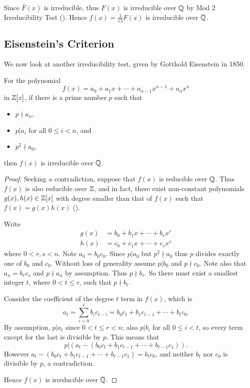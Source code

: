 \begin{example}
    Since $\bar{F}(x)$ is irreducible, thus $F(x)$ is irreducible over $\mathbb{Q}$ by Mod 2 Irreducibility Test (). Hence $f(x) = \frac1{15} F(x)$ is irreducible over $\mathbb{Q}$.
\end{example}

\subsection{Eisenstein's Criterion}
We now look at another irreducibility test, given by Gotthold Eisenstein in 1850.

\begin{theorem}\label{thrm-eisenstein-criterion}
    For the polynomial
    \[
        f(x) = a_0 + a_1x + \cdots + a_{n-1}x^{n-1} + a_nx^n
    \]
    in $\mathbb{Z}[x]$, if there is a prime number $p$ such that
    \begin{itemize}
        \item $p \nmid a_n$,
        \item $p \vert a_i$ for all $0 \leq i < n$, and
        \item $p^2 \nmid a_0$,
    \end{itemize}
    then $f(x)$ is irreducible over $\mathbb{Q}$.
\end{theorem}
\begin{proof}
    Seeking a contradiction, suppose that $f(x)$ is reducible over $\mathbb{Q}$. Thus $f(x)$ is also reducible over $\mathbb{Z}$, and in fact, there exist non-constant polynomials $g(x),h(x) \in \mathbb{Z}[x]$ with degree smaller than that of $f(x)$ such that $f(x) = g(x)h(x)$ ().

    Write
    \begin{align*}
        g(x) &= b_0 + b_1x + \cdots + b_rx^r\\
        h(x) &= c_0 + c_1x + \cdots + c_sx^s
    \end{align*}
    where $0 < r, s < n$. Note $a_0 = b_0c_0$. Since $p \vert a_0$ but $p^2 \nmid a_0$ thus $p$ divides exactly one of $b_0$ and $c_0$. Without loss of generality assume $p \vert b_0$ and $p \nmid c_0$. Note also that $a_n = b_rc_s$ and $p \nmid a_n$ by assumption. Thus $p \nmid b_r$. So there must exist a smallest integer $t$, where $0 < t \leq r$, such that $p \nmid b_t$.

    Consider the coefficient of the degree $t$ term in $f(x)$, which is
    \[
        a_t = \sum_{i=0}^tb_ic_{t-i} = b_0c_t + b_1c_{t-1} + \cdots + b_tc_0.
    \]
    By assumption, $p \vert a_t$ since $0 < t \leq r < n$; also $p \vert b_i$ for all $0 \leq i < t$, so every term except for the last is divisible by $p$. This means that
    \[
        p \vert (a_t - (b_0c_t + b_1c_{t-1} + \cdots + b_{t-1}c_1)).
    \]
    However $a_t - (b_0c_t + b_1c_{t-1} + \cdots + b_{t-1}c_1) = b_tc_0$, and neither $b_t$ nor $c_0$ is divisible by $p$, a contradiction.

    Hence $f(x)$ is irreducible over $\mathbb{Q}$.
\end{proof}

